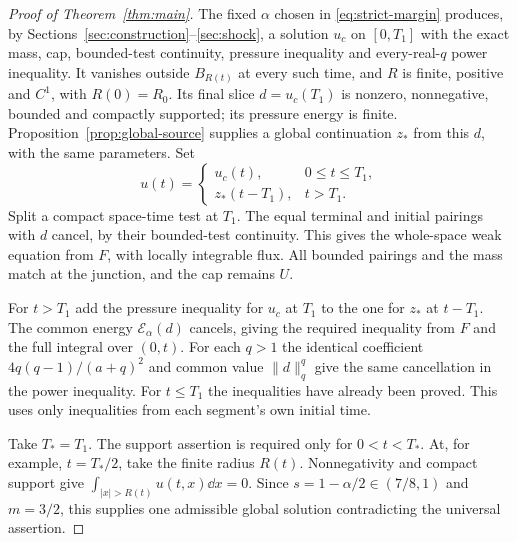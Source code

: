 \begin{proof}[Proof of Theorem~\ref{thm:main}]
The fixed $\alpha$ chosen in \eqref{eq:strict-margin} produces, by
Sections~\ref{sec:construction}--\ref{sec:shock}, a solution $u_c$ on
$[0,T_1]$ with the exact mass, cap, bounded-test continuity, pressure
inequality and every-real-$q$ power inequality. It vanishes outside
$B_{R(t)}$ at every such time, and $R$ is finite, positive and $C^1$,
with $R(0)=R_0$. Its final slice $d=u_c(T_1)$ is nonzero, nonnegative,
bounded and compactly supported; its pressure energy is finite.
Proposition~\ref{prop:global-source} supplies a global continuation
$z_*$ from this $d$, with the same parameters. Set
\[
 u(t)=\begin{cases}u_c(t),&0\leq t\leq T_1,\\
 z_*(t-T_1),&t>T_1.\end{cases}
\]
Split a compact space-time test at $T_1$. The equal terminal and initial
pairings with $d$ cancel, by their bounded-test continuity. This gives
the whole-space weak equation from $F$, with locally integrable flux.
All bounded pairings and the mass match at the junction, and the cap
remains $U$.

For $t>T_1$ add the pressure inequality for $u_c$ at $T_1$ to the one
for $z_*$ at $t-T_1$. The common energy $\mathcal E_\alpha(d)$ cancels,
giving the required inequality from $F$ and the full integral over
$(0,t)$. For each $q>1$ the identical coefficient
$4q(q-1)/(a+q)^2$ and common value $\|d\|_q^q$ give the same
cancellation in the power inequality. For $t\leq T_1$ the inequalities
have already been proved. This uses only inequalities from each
segment's own initial time.

Take $T_*=T_1$. The support assertion is required only for $0<t<T_*$.
At, for example,
$t=T_*/2$, take the finite radius $R(t)$. Nonnegativity and compact
support give $\int_{|x|>R(t)}u(t,x)\dd x=0$.
Since $s=1-\alpha/2\in(7/8,1)$ and $m=3/2$, this supplies one
admissible global solution contradicting the universal assertion.
\end{proof}
